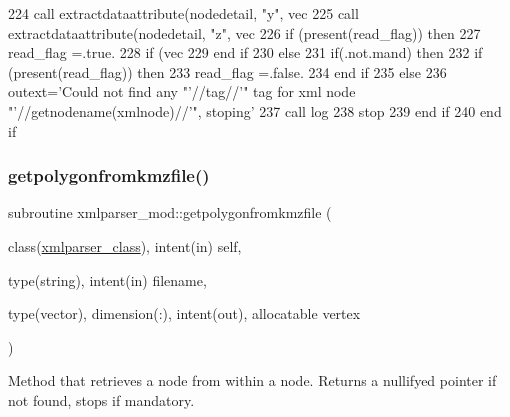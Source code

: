 \begin{DoxyCode}
224         \textcolor{keyword}{call }extractdataattribute(nodedetail, \textcolor{stringliteral}{"y"}, vec%
225         \textcolor{keyword}{call }extractdataattribute(nodedetail, \textcolor{stringliteral}{"z"}, vec%
226         \textcolor{keywordflow}{if} (\textcolor{keyword}{present}(read\_flag)) \textcolor{keywordflow}{then}
227             read\_flag =.true.
228             \textcolor{keywordflow}{if} (vec%
229 \textcolor{keywordflow}{        end if}
230     \textcolor{keywordflow}{else}
231         \textcolor{keywordflow}{if}(.not.mand) \textcolor{keywordflow}{then}
232             \textcolor{keywordflow}{if} (\textcolor{keyword}{present}(read\_flag)) \textcolor{keywordflow}{then}
233                 read\_flag =.false.
234 \textcolor{keywordflow}{            end if}
235         \textcolor{keywordflow}{else}
236             outext=\textcolor{stringliteral}{'Could not find any "'}//tag//\textcolor{stringliteral}{'" tag for xml node "'}//getnodename(xmlnode)//\textcolor{stringliteral}{'", stoping'}
237             \textcolor{keyword}{call }log%
238             stop
239 \textcolor{keywordflow}{        end if}
240 \textcolor{keywordflow}{    end if}
\end{DoxyCode}
\mbox{\label{namespacexmlparser__mod_aa62d7fce2037454ba8fad993c6f1c8fd}} 
\subsubsection{\texorpdfstring{getpolygonfromkmzfile()}{getpolygonfromkmzfile()}}
{\footnotesize\ttfamily subroutine xmlparser\+\_\+mod\+::getpolygonfromkmzfile (\begin{DoxyParamCaption}\item[{class(\mbox{\hyperlink{structxmlparser__mod_1_1xmlparser__class}{xmlparser\+\_\+class}}), intent(in)}]{self,  }\item[{type(string), intent(in)}]{filename,  }\item[{type(vector), dimension(\+:), intent(out), allocatable}]{vertex }\end{DoxyParamCaption})\hspace{0.3cm}{\ttfamily [private]}}



Method that retrieves a node from within a node. Returns a nullifyed pointer if not found, stops if mandatory. 

